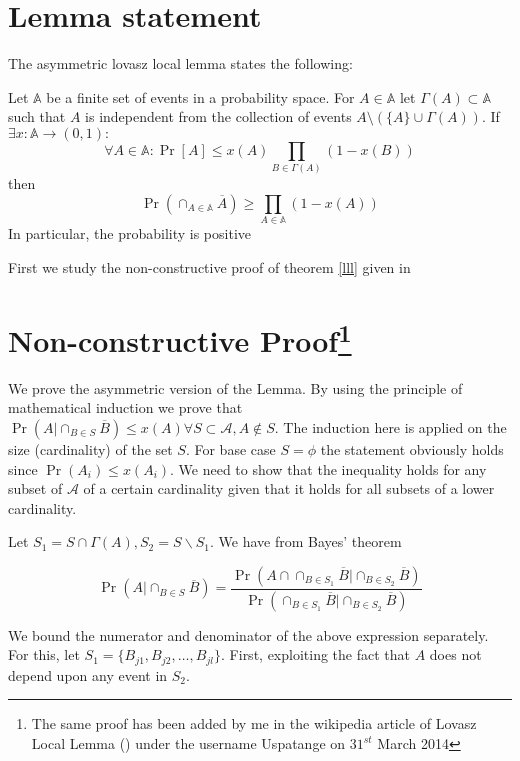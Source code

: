 


\section{Lemma statement}
The asymmetric lovasz local lemma \cite{original} states the following:
\begin{theorem}
\label{lll}
 Let $\mathbb{A}$ be a finite set of events in a probability space. For $A\in \mathbb{A}$ let $\Gamma(A)\subset \mathbb{A} $ such that $A$ is independent from the collection of events $A\setminus (\{A\}\cup\Gamma(A) ) $. If $\exists x:\mathbb{A} \longrightarrow (0,1): $
 \[
    \forall A\in \mathbb{A} : \Pr[A] \leq x(A) \prod\limits_{B\in\Gamma(A) }(1-x(B) )
 \]
 then
 \[
    \Pr(\cap_{A\in\mathbb{A}}\overline{A} ) \geq \prod\limits_{A\in\mathbb{A}}(1-x(A) )
 \]
 In particular, the probability is positive
\end{theorem}
First we study the non-constructive proof of theorem \ref{lll} given in \cite{assym}

\section[Non-constructive Proof]{Non-constructive Proof\footnote{The same proof has been added by me in the wikipedia article of Lovasz Local Lemma () under the username Uspatange on $31^{st}$ March 2014 }}
We prove the asymmetric version of the Lemma. By using the principle of mathematical induction we prove that $ \Pr\left(A|\cap_{B \in S}\overline{B}\right)\leq x\left(A\right) \forall S \subset \mathcal{A}, A \not\in S $. The induction here is applied on the size (cardinality) of the set $ S $. For base case $S=\phi$ the statement obviously holds since $ \Pr\left(A_i\right) \leq x\left(A_i\right) $. We need to show that the inequality holds for any subset of $\mathcal{A} $ of a certain cardinality given that it holds for all subsets of a lower cardinality.

Let $S_{1} = S\cap \Gamma(A), S_{2} = {{S \smallsetminus S_{1}}}$. We have from Bayes' theorem

\[
\Pr\left(A|\cap_{B\in S} \overline{B}\right) = \frac{\Pr\left(A\cap\cap_{B\in S_{1}} \overline{B}| \cap_{B\in S_{2}} \overline{B}\right)}{\Pr\left(\cap_{B\in S_{1}}\overline{B}|\cap_{B\in S_{2}} \overline{B} \right)}  \]

We bound the numerator and denominator of the above expression separately. For this, let $ S_{1}=\{B_{j1},B_{j2},\ldots,B_{jl}\} $. First, exploiting the fact that $A$ does not depend upon any event in $ S_{2} $.

